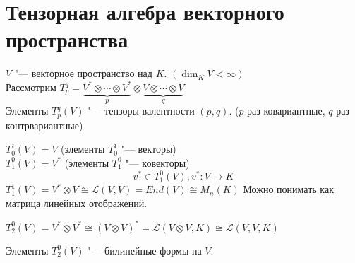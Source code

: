﻿
\section{Тензорная алгебра векторного пространства}
$V$ "--- векторное пространство над $K$. $(\dim_{K}V < \infty)$\\
Рассмотрим $T_p^q = \underbrace{V^*\otimes \cdots \otimes V^*}_{p} \otimes \underbrace{V \otimes \cdots \otimes V}_{q}$\\
Элементы $T_{p}^q(V)$ "--- тензоры валентности $(p, q)$. ($p$ раз ковариантные, $q$ раз контрвариантные)

$T_0^1(V) = V$ (элементы $T_0^1$ "--- векторы)\\
$T_1^0(V) = V^*$ (элементы $T_1^0$ "--- ковекторы)\\
$$v^* \in T_1^0(V), v^* \colon V \to K$$
$T_1^1(V) = V^* \otimes V \cong \mathcal{L}(V, V) = End(V) \cong M_n(K)$
Можно понимать как матрица линейных отображений. 

$T_2^0(V) = V^*\otimes V^* \cong (V \otimes V)^* = \mathcal{L}(V \otimes V, K) \cong \mathcal{L}(V, V, K)$ 

Элементы $T_2^0(V)$ "--- билинейные формы на $V$.

